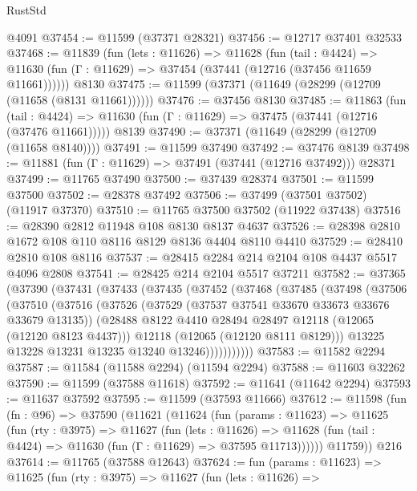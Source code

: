 \begin{lexlean}{RustStd}
\begin{coremodule}
    @4091
@37454 := @11599 (@37371 @28321)
@37456 := @12717 @37401 @32533
@37468 := @11839
    (fun (lets : @11626) =>
    @11628
      (fun (tail : @4424) =>
      @11630 (fun (Γ : @11629) => @37454 (@37441 (@12716 (@37456 @11659 @11661))))))
    @8130
@37475 := @11599 (@37371 (@11649 (@28299 (@12709 (@11658 (@8131 @11661))))))
@37476 := @37456 @8130
@37485 := @11863
    (fun (tail : @4424) => @11630 (fun (Γ : @11629) => @37475 (@37441 (@12716 (@37476 @11661)))))
    @8139
@37490 := @37371 (@11649 (@28299 (@12709 (@11658 @8140))))
@37491 := @11599 @37490
@37492 := @37476 @8139
@37498 := @11881 (fun (Γ : @11629) => @37491 (@37441 (@12716 @37492))) @28371
@37499 := @11765 @37490
@37500 := @37439 @28374
@37501 := @11599 @37500
@37502 := @28378 @37492
@37506 := @37499 (@37501 @37502) (@11917 @37370)
@37510 := @11765 @37500 @37502 (@11922 @37438)
@37516 := @28390 @2812 @11948 @108 @8130 @8137 @4637
@37526 := @28398 @2810 @1672 @108 @110 @8116 @8129 @8136 @4404 @8110 @4410
@37529 := @28410 @2810 @108 @8116
@37537 := @28415 @2284 @214 @2104 @108 @4437 @5517 @4096 @2808
@37541 := @28425 @214 @2104 @5517 @37211
@37582 := @37365
    (@37390
      (@37431
        (@37433
          (@37435
            (@37452
              (@37468
                (@37485
                  (@37498
                    (@37506
                      (@37510
                        (@37516
                          (@37526
                            (@37529 (@37537 @37541 @33670 @33673 @33676 @33679 @13135))
                            (@28488 @8122 @4410 @28494 @28497 @12118 (@12065 (@12120 @8123 @4437)))
                            @12118
                            (@12065 (@12120 @8111 @8129)))
                          @13225
                          @13228
                          @13231
                          @13235
                          @13240
                          @13246)))))))))))
@37583 := @11582 @2294
@37587 := @11584 (@11588 @2294) (@11594 @2294)
@37588 := @11603 @32262
@37590 := @11599 (@37588 @11618)
@37592 := @11641 (@11642 @2294)
@37593 := @11637 @37592
@37595 := @11599 (@37593 @11666)
@37612 := @11598
    (fun (fn : @96) =>
    @37590
      (@11621
        (@11624
          (fun (params : @11623) =>
          @11625
            (fun (rty : @3975) =>
            @11627
              (fun (lets : @11626) =>
              @11628 (fun (tail : @4424) => @11630 (fun (Γ : @11629) => @37595 @11713))))))
        @11759))
    @216
@37614 := @11765 (@37588 @12643)
@37624 := fun (params : @11623) =>
  @11625
    (fun (rty : @3975) =>
    @11627
      (fun (lets : @11626) =>

\end{coremodule}
\end{lexlean}
